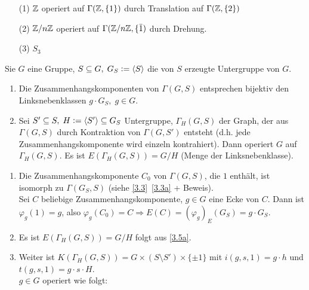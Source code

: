 \documentclass[a4paper, 10pt]{report}
\begin{document}

\begin{nnBsp}
\begin{enumerate}
  \item[(1)] $\mathbb{Z}$ operiert auf $\Gamma(\mathbb{Z}, \{1\})$ durch Translation auf
  $\Gamma(\mathbb{Z}, \{2\})$
  \item[(2)] $\mathbb{Z}/n\mathbb{Z}$ operiert auf $\Gamma(\mathbb{Z}/n\mathbb{Z},\{\bar{1})$ durch Drehung.
  \item[(3)] $S_3$
\end{enumerate}
\end{nnBsp}


\begin{Prop} 
Sie $G$ eine Gruppe, $S \subseteq G,\; G_S \mathrel{\mathop:}= \langle S \rangle$ die von $S$
erzeugte Untergruppe von $G$.
\begin{enumerate}
  \item \label{3.5a}
  Die Zusammenhangskomponenten von $\Gamma(G,S)$ entsprechen bijektiv den
  Linksnebenklassen $g \cdot G_S, \; g \in G$.
  \item Sei $S' \subseteq S, \; H \mathrel{\mathop:}= \langle S' \rangle \subseteq G_S$
  Untergruppe, $\Gamma_H(G,S)$ der Graph, der aus $\Gamma(G,S)$ durch
  Kontraktion von $\Gamma(G,S')$ entsteht (d.h. jede Zusammenhangskomponente
  wird einzeln kontrahiert).
  Dann operiert $G$ auf $\Gamma_H(G,S)$.
  Es ist $E(\Gamma_H(G,S))=G/H$ (Menge der Linksnebenklasse).
\end{enumerate}
\end{Prop}

\begin{Bew}
\begin{enumerate}
  \item Die Zusammenhangskomponente $C_0$ von $\Gamma(G,S)$, die $1$ enthält,
  ist isomorph zu $\Gamma(G_S,S)$ (siehe \ref*{3.3}~\ref{3.3a} + Beweis).\\
  Sei $C$ beliebige Zusammenhangskomponente, $g \in G$ eine Ecke von $C$.
  Dann ist $\varphi_g(1)=g$, also $\varphi_g(C_0) = C \Rightarrow E(C) = 
  (\varphi_g)_E(G_S) = g \cdot G_S$.
  \item Es ist $E(\Gamma_H(G,S))=G/H$ folgt aus \ref{3.5a}.\\
  \item Weiter ist $K(\Gamma_H(G,S)) = G \times (S \setminus S') \times
  \{\pm 1\}$ mit $i(g,s,1) = g \cdot h$ und $t(g,s,1)=g \cdot s \cdot
  H$.\\
  $g \in G$ operiert wie folgt: 
\end{enumerate}
\end{Bew}
\end{document}

